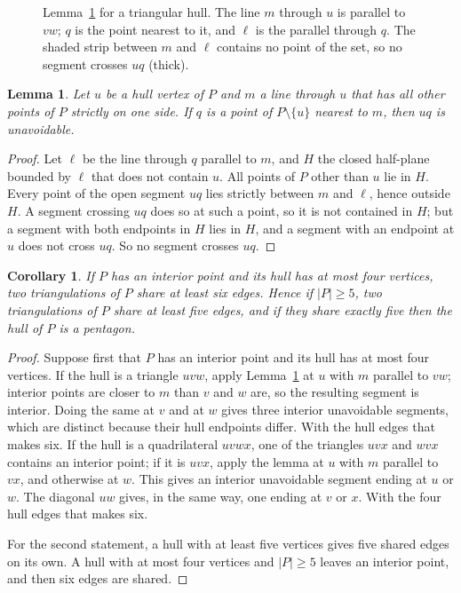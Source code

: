 \documentclass[11pt]{amsart}
\newtheorem{lemma}[theorem]{Lemma}
\newtheorem{corollary}[theorem]{Corollary}
\theoremstyle{definition}
\begin{document}
\begin{figure}[t]
\centering
\caption{Lemma~\ref{lem:sweep} for a triangular hull. The line $m$ through $u$ is parallel to $vw$; $q$ is the point nearest to it, and $\ell$ is the parallel through $q$. The shaded strip between $m$ and $\ell$ contains no point of the set, so no segment crosses $uq$ (thick).}\label{fig:sweep}
\end{figure}

\begin{lemma}\label{lem:sweep}
Let $u$ be a hull vertex of $P$ and $m$ a line through $u$ that has all other points of $P$ strictly on one side. If $q$ is a point of $P\setminus\{u\}$ nearest to $m$, then $uq$ is unavoidable.
\end{lemma}

\begin{proof}
Let $\ell$ be the line through $q$ parallel to $m$, and $H$ the closed half-plane bounded by $\ell$ that does not contain $u$. All points of $P$ other than $u$ lie in $H$. Every point of the open segment $uq$ lies strictly between $m$ and $\ell$, hence outside $H$. A segment crossing $uq$ does so at such a point, so it is not contained in $H$; but a segment with both endpoints in $H$ lies in $H$, and a segment with an endpoint at $u$ does not cross $uq$. So no segment crosses $uq$.
\end{proof}

\begin{corollary}\label{cor:lower}
If $P$ has an interior point and its hull has at most four vertices, two triangulations of $P$ share at least six edges. Hence if $|P|\geq5$, two triangulations of $P$ share at least five edges, and if they share exactly five then the hull of $P$ is a pentagon.
\end{corollary}

\begin{proof}
Suppose first that $P$ has an interior point and its hull has at most four vertices. If the hull is a triangle $uvw$, apply Lemma~\ref{lem:sweep} at $u$ with $m$ parallel to $vw$; interior points are closer to $m$ than $v$ and $w$ are, so the resulting segment is interior. Doing the same at $v$ and at $w$ gives three interior unavoidable segments, which are distinct because their hull endpoints differ. With the hull edges that makes six. If the hull is a quadrilateral $uvwx$, one of the triangles $uvx$ and $wvx$ contains an interior point; if it is $uvx$, apply the lemma at $u$ with $m$ parallel to $vx$, and otherwise at $w$. This gives an interior unavoidable segment ending at $u$ or $w$. The diagonal $uw$ gives, in the same way, one ending at $v$ or $x$. With the four hull edges that makes six.

For the second statement, a hull with at least five vertices gives five shared edges on its own. A hull with at most four vertices and $|P|\geq5$ leaves an interior point, and then six edges are shared.
\end{proof}
\end{document}
